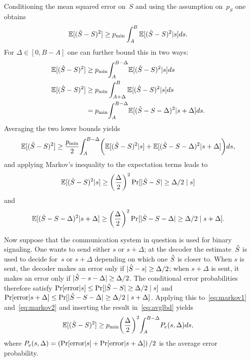 \begin{subappendices}
  Conditioning the mean squared error on~$S$ and using the assumption on~$p_S$
  one obtains
  \begin{equation*}
    {\mathbb{E}[({\hat{S}}- S)^2]} \ge {p_{\min}} \int_A^B {\mathbb{E}[({\hat{S}} - S)^2 | s]} ds.
  \end{equation*}
  For $\Delta \in [0, B-A]$ one can further bound this in two ways:
  \begin{align*}
    {\mathbb{E}[({\hat{S}}- S)^2]} &\ge {p_{\min}} {\int_A^{B-\Delta}} {\mathbb{E}[({\hat{S}}- S)^2 | s]} ds \\
    {\mathbb{E}[({\hat{S}} - S)^2]} &\ge {p_{\min}} \int_{A+\Delta}^B {\mathbb{E}[({\hat{S}} - S)^2 | s]} ds \\
    &= {p_{\min}} {\int_A^{B-\Delta}} {\mathbb{E}[({\hat{S}} - S - \Delta)^2 | s + \Delta]} ds.
  \end{align*}
  Averaging the two lower bounds yields
  \begin{equation}
    \label{eq:avglbd}
    {\mathbb{E}[({\hat{S}}- S)^2]} \ge \frac{{p_{\min}}}{2} {\int_A^{B-\Delta}} \bigg( {\mathbb{E}[({\hat{S}} - S)^2 | s]} + \\
    {\mathbb{E}[({\hat{S}} - S - \Delta)^2 | s + \Delta]} \bigg) ds,
  \end{equation}
  and applying Markov's inequality to the expectation terms leads to
  \begin{equation}
    \label{eq:markov1}
    {\mathbb{E}[({\hat{S}}- S)^2 | s]} \ge {\left(\frac{\Delta}{2}\right)^2} \Pr[|{\hat{S}} - S| \ge \Delta/2 \mid s]
  \end{equation}
  and
  \begin{equation}
    \label{eq:markov2}
    {\mathbb{E}[({\hat{S}}- S - \Delta)^2 | s + \Delta]} \\
    \ge {\left(\frac{\Delta}{2}\right)^2} \Pr[|{\hat{S}} - S - \Delta| \ge \Delta/2 \mid s+\Delta].
  \end{equation}

  Now suppose that the communication system in question is used for binary
  signaling. One wants to send either $s$ or $s+\Delta$; at the decoder the
  estimate~${\hat{S}}$ is used to decide for~$s$ or $s + \Delta$ depending on which
  one ${\hat{S}}$ is closer to. When $s$ is sent, the decoder makes an error only if
  $|{\hat{S}} - s| \ge \Delta/2$; when $s + \Delta$ is sent, it makes an error only if
  $|{\hat{S}} - s - \Delta| \ge \Delta/2$. The conditional error probabilities
  therefore satisfy $\Pr[\text{error} | s] \le \Pr[|{\hat{S}} - S| \ge \Delta/2 \mid
  s]$ and $\Pr[\text{error} | s + \Delta] \le \Pr[|{\hat{S}} - S - \Delta| \ge
  \Delta/2 \mid s + \Delta]$. Applying this to~\eqref{eq:markov1}
  and~\eqref{eq:markov2} and inserting the result in~\eqref{eq:avglbd} yields
  \begin{equation}
    \label{eq:zivalmostproved}
    {\mathbb{E}[({\hat{S}}- S)^2]} \ge {p_{\min}} {\left(\frac{\Delta}{2}\right)^2} {\int_A^{B-\Delta}} P_e(s, \Delta) ds,
  \end{equation}
  where $P_e(s, \Delta) = \left(\Pr[\text{error}|s] + \Pr[\text{error}|s +
  \Delta] \right)/2$ is the average error probability.


\end{subappendices}
